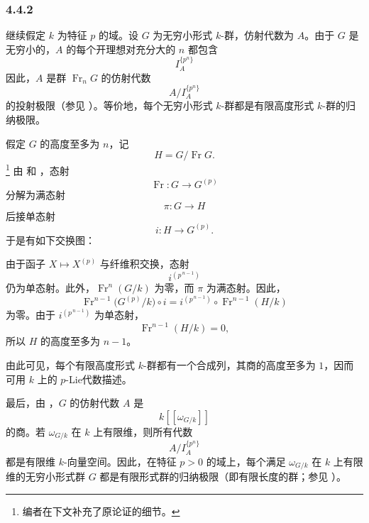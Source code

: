 
\subsubsection*{4.4.2}
\label{sga3:VIIB:4.4.2}

继续假定 \(k\) 为特征 \(p\) 的域。设 \(G\) 为无穷小形式 \(k\)-群，仿射代数为 \(A\)。由于 \(G\) 是无穷小的，\(A\) 的每个开理想对充分大的 \(n\) 都包含
\[
  I_A^{\{p^n\}}
\]
因此，\(A\) 是群 \(\operatorname{Fr}_nG\) 的仿射代数
\[
  A/I_A^{\{p^n\}}
\]
的投射极限\textup{（参见 ）}。等价地，每个无穷小形式 \(k\)-群都是有限高度形式 \(k\)-群的归纳极限。

假定 \(G\) 的高度至多为 \(n\)，记
\[
  H=G/\operatorname{Fr}G.
\]
\footnote{\label{sga3:VIIB:nde:141}编者在下文补充了原论证的细节。}
由  和 ，态射
\[
  \operatorname{Fr}:G\longrightarrow G^{(p)}
\]
分解为满态射
\[
  \pi:G\longrightarrow H
\]
后接单态射
\[
  i:H\longrightarrow G^{(p)}.
\]
于是有如下交换图：
\begin{center}
  \label{sga3:VIIB:4.4.2:height-reduction-frobenius-diagram}
  
\end{center}
由于函子 \(X\mapsto X^{(p)}\) 与纤维积交换，态射
\[
  i^{(p^{\,n-1})}
\]
仍为单态射。此外，\(\operatorname{Fr}^{n}(G/k)\) 为零，而 \(\pi\) 为满态射。因此，
\[
  \operatorname{Fr}^{n-1}\bigl(G^{(p)}/k\bigr)\circ i
  =
  i^{(p^{\,n-1})}\circ
  \operatorname{Fr}^{n-1}(H/k)
\]
为零。由于 \(i^{(p^{\,n-1})}\) 为单态射，
\[
  \operatorname{Fr}^{n-1}(H/k)=0,
\]
所以 \(H\) 的高度至多为 \(n-1\)。

由此可见，每个有限高度形式 \(k\)-群都有一个合成列，其商的高度至多为 \(1\)，因而可用 \(k\) 上的 \(p\)-Lie代数描述。

最后，由 ，\(G\) 的仿射代数 \(A\) 是
\[
  k[[\omega_{G/k}]]
\]
的商。若 \(\omega_{G/k}\) 在 \(k\) 上有限维，则所有代数
\[
  A/I_A^{\{p^n\}}
\]
都是有限维 \(k\)-向量空间。因此，在特征 \(p>0\) 的域上，每个满足 \(\omega_{G/k}\) 在 \(k\) 上有限维的无穷小形式群 \(G\) 都是有限形式群的归纳极限\textup{（即有限长度的群；参见 ）}。
